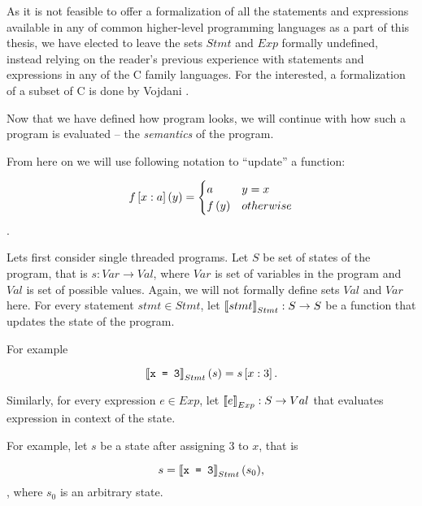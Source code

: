 \documentclass[..thesis.tex]{subfiles}
\begin{document}
As it is not feasible to offer a formalization of all the statements and expressions available in any of common higher-level programming languages
as a part of this thesis, we have elected to leave the sets $Stmt$ and $Exp$ formally undefined, instead relying on the reader's previous experience
with statements and expressions in any of the C family languages. For the interested, a formalization of a subset of C is done by Vojdani .



Now that we have defined how program looks, we will continue with how such a program is evaluated -- the \textit{semantics} of the program.

From here on we will use following notation to ``update'' a function:

\begin{equation*}
f \left[ x : a \right] \left( y \right) = 
  \begin{cases}
  a & y = x \\
  f \left(  y \right) & otherwise \\ 
  \end{cases}
\end{equation*}.

Lets first consider single threaded programs. Let $S$ be set of states of the program, that is $s : Var \to Val$, where $Var$ is set of
variables in the program and $Val$ is set of possible values. Again, we will not formally define sets $Val$ and $Var$ here.
For every statement $stmt \in Stmt$, let $ \left\llbracket stmt \right\rrbracket_{Stmt} : S \to S$ be a function that updates the state of the program. 

For example

\begin{equation*}
 \left\llbracket \text{\texttt{x = 3}} \right\rrbracket_{Stmt} (s) = s \left[ x : 3 \right] \text{.}
\end{equation*}

Similarly, for every expression $e \in Exp$, let $\left\llbracket e \right\rrbracket_{Exp} : S \to Val$ that evaluates expression in context of the state. 

For example, let $s$ be a state after assigning $3$ to $x$, that is

\begin{equation*}
s = \left\llbracket \text{\texttt{x = 3}} \right\rrbracket_{Stmt} (s_0) \text{,}
\end{equation*},
where $s_0$ is an arbitrary state. 
\end{document}
